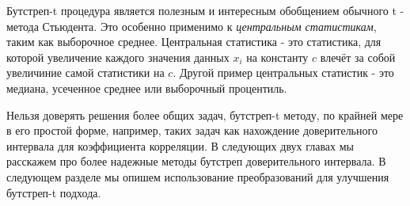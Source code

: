 Бутстреп-t процедура является полезным и интересным обобщением обычного t - метода Стьюдента. Это особенно применимо к \textit{центральным статистикам}, таким как выборочное среднее. Центральная статистика - это статистика, для которой увеличение каждого значения данных $x_{i}$ на константу $c$ влечёт за собой увеличиние самой статистики на $c$. Другой пример центральных статистик - это медиана, усеченное среднее или выборочный процентиль.

Нельзя доверять решения более общих задач, бутстреп-t методу, по крайней мере в его простой форме, например, таких задач как нахождение доверительного интервала для коэффициента корреляции. В следующих двух главах мы расскажем про более надежные методы бутстреп доверительного интервала. В следующем разделе мы опишем использование преобразований для улучшения бутстреп-t подхода.